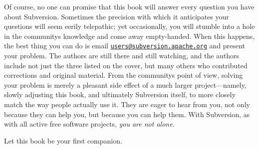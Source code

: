 Of course, no one can promise that this book will answer every question
you have about Subversion. Sometimes the precision with which it
anticipates your questions will seem eerily telepathic; yet
occasionally, you will stumble into a hole in the
community\textquotesingle s knowledge and come away empty-handed. When
this happens, the best thing you can do is email
\href{mailto:users@subversion.apache.org}{\nolinkurl{users@subversion.apache.org}}
and present your problem. The authors are still there and still
watching, and the authors include not just the three listed on the
cover, but many others who contributed corrections and original
material. From the community\textquotesingle s point of view, solving
your problem is merely a pleasant side effect of a much larger
project---namely, slowly adjusting this book, and ultimately Subversion
itself, to more closely match the way people actually use it. They are
eager to hear from you, not only because they can help you, but because
you can help them. With Subversion, as with all active free software
projects, \emph{you are not alone}.

Let this book be your first companion.

